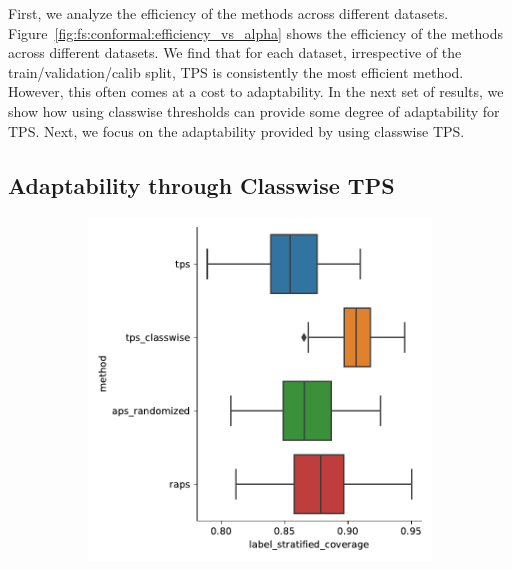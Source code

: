 First, we analyze the efficiency of the methods across different datasets.
Figure~\ref{fig:fs:conformal:efficiency_vs_alpha} shows the efficiency of the methods across different datasets.
We find that for each dataset, irrespective of the train/validation/calib split, TPS is consistently the most efficient method.
However, this often comes at a cost to adaptability.
In the next set of results, we show how using classwise thresholds can provide some degree of adaptability for TPS.
Next, we focus on the adaptability provided by using classwise TPS.

\subsection{Adaptability through Classwise TPS}
\begin{figure}
    \centering
    \begin{subfigure}{0.48\linewidth}
    \includegraphics[width=\linewidth]{graphConformal/figures/split/citeseer_label_stratified_coverage}
    \end{subfigure}
    \begin{subfigure}{0.48\linewidth}

\end{subfigure}
\end{figure}
